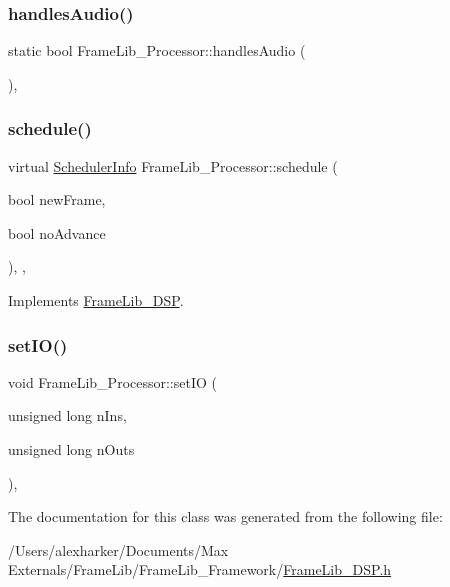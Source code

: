 \subsubsection{\texorpdfstring{handles\+Audio()}{handlesAudio()}}
{\footnotesize\ttfamily static bool Frame\+Lib\+\_\+\+Processor\+::handles\+Audio (\begin{DoxyParamCaption}{ }\end{DoxyParamCaption})\hspace{0.3cm}{\ttfamily [inline]}, {\ttfamily [static]}}

\mbox{\label{class_frame_lib___processor_a2487e6433f6a5e79014664a0500ccc24}} 
\subsubsection{\texorpdfstring{schedule()}{schedule()}}
{\footnotesize\ttfamily virtual \hyperlink{struct_frame_lib___d_s_p_1_1_scheduler_info}{Scheduler\+Info} Frame\+Lib\+\_\+\+Processor\+::schedule (\begin{DoxyParamCaption}\item[{bool}]{new\+Frame,  }\item[{bool}]{no\+Advance }\end{DoxyParamCaption})\hspace{0.3cm}{\ttfamily [inline]}, {\ttfamily [protected]}, {\ttfamily [virtual]}}



Implements \hyperlink{class_frame_lib___d_s_p}{Frame\+Lib\+\_\+\+D\+SP}.

\mbox{\label{class_frame_lib___processor_a84035040e5e1cff07e16502ee290881e}} 
\subsubsection{\texorpdfstring{set\+I\+O()}{setIO()}}
{\footnotesize\ttfamily void Frame\+Lib\+\_\+\+Processor\+::set\+IO (\begin{DoxyParamCaption}\item[{unsigned long}]{n\+Ins,  }\item[{unsigned long}]{n\+Outs }\end{DoxyParamCaption})\hspace{0.3cm}{\ttfamily [inline]}, {\ttfamily [protected]}}



The documentation for this class was generated from the following file\+:\begin{DoxyCompactItemize}
\item 
/\+Users/alexharker/\+Documents/\+Max Externals/\+Frame\+Lib/\+Frame\+Lib\+\_\+\+Framework/\hyperlink{_frame_lib___d_s_p_8h}{Frame\+Lib\+\_\+\+D\+S\+P.\+h}\end{DoxyCompactItemize}
